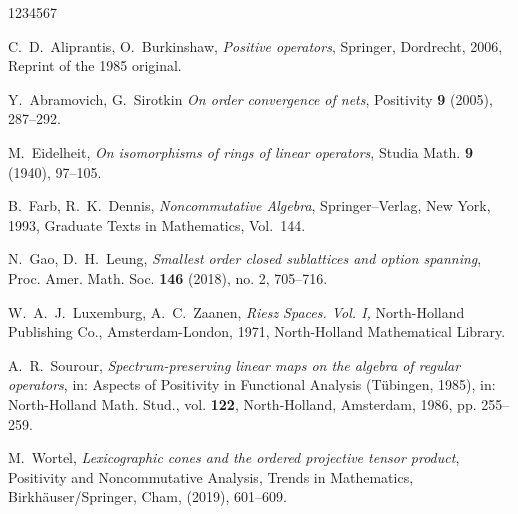 \documentclass[12pt,reqno]{amsart}
\theoremstyle{plain}
\theoremstyle{definition}
\begin{document}
\begin{thebibliography}{1234567}



C.~D.~Aliprantis, O.~Burkinshaw, \emph{Positive operators}, Springer,
  Dordrecht, 2006, Reprint of the 1985 original.

Y.~Abramovich, G.~Sirotkin
\emph{On order convergence of nets},
Positivity \textbf{9} (2005),  287--292.

M.~Eidelheit,
\emph{On isomorphisms of rings of linear operators},
Studia Math. \textbf{9} (1940), 97--105.

B.~Farb, R.~K.~Dennis,
\textit{Noncommutative Algebra},
Springer–Verlag, New York, 1993,
Graduate Texts in Mathematics, Vol.~144.


N.~Gao, D.~H.~Leung, \emph{Smallest order closed sublattices and option spanning},
Proc. Amer. Math. Soc. \textbf{146} (2018), no. 2, 705--716.

W.~A.~J.~Luxemburg, A.~C.~Zaanen, \textit{Riesz Spaces. Vol. I,} North-Holland Publishing Co., Amsterdam-London, 1971, North-Holland Mathematical Library.

A.~R.~Sourour, \emph{Spectrum-preserving linear maps on the algebra of regular operators}, in: Aspects of Positivity in Functional Analysis (T\"ubingen, 1985), in: North-Holland Math. Stud., vol. \textbf{122}, North-Holland, Amsterdam, 1986, pp. 255–259.


M.~Wortel, \emph{Lexicographic cones and the ordered projective tensor product}, 
Positivity and Noncommutative Analysis, 
Trends in Mathematics, Birkhäuser/Springer, Cham, (2019), 601--609.



\end{thebibliography}
\end{document}
